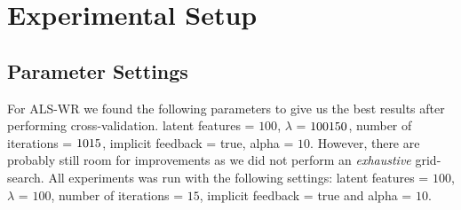 
\section{Experimental Setup}

\subsection{Parameter Settings}

For ALS-WR we found the following parameters to give us the best results after performing cross-validation.
latent features = $100$, $\lambda$ = $100\-150$, number of iterations = $10\-15$, implicit feedback = true, alpha = $10$.
However, there are probably still room for improvements as we did not perform an \emph{exhaustive} grid-search.
All experiments was run with the following settings: latent features = $100$, $\lambda$ = $100$, number of iterations = $15$,
implicit feedback = true and alpha = $10$.